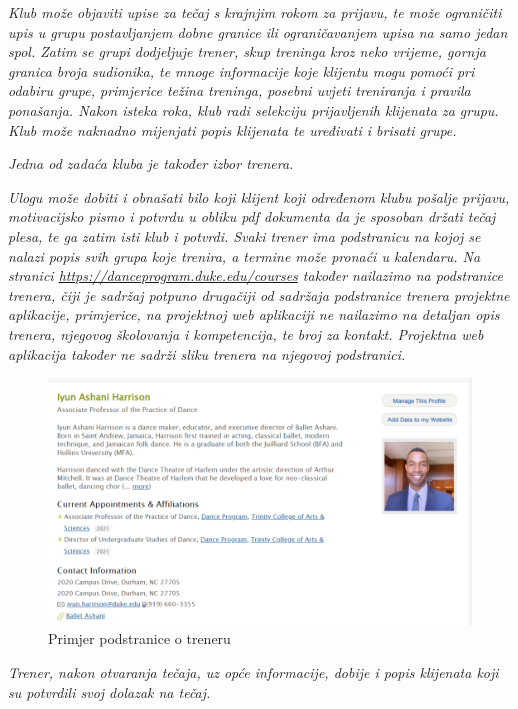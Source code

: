 \textit{Klub može objaviti upise za tečaj s krajnjim rokom za prijavu, te može ograničiti upis u grupu postavljanjem dobne granice ili ograničavanjem upisa na samo jedan spol. Zatim se grupi dodjeljuje trener, skup treninga kroz neko vrijeme, gornja granica broja sudionika, te mnoge informacije koje klijentu mogu pomoći pri odabiru grupe, primjerice težina treninga, posebni uvjeti treniranja i pravila ponašanja. Nakon isteka roka, klub radi selekciju prijavljenih klijenata za grupu. Klub može naknadno mijenjati popis klijenata te uređivati i brisati grupe.}

\textit{Jedna od zadaća kluba je također izbor trenera.}

\textit{Ulogu  može dobiti i obnašati bilo koji klijent koji određenom klubu pošalje prijavu, motivacijsko pismo i potvrdu u obliku pdf dokumenta da je sposoban držati tečaj plesa, te ga zatim isti klub i potvrdi. Svaki trener ima podstranicu na kojoj se nalazi popis svih grupa koje trenira, a termine može pronaći u kalendaru. Na stranici \url{https://danceprogram.duke.edu/courses} također nailazimo na podstranice trenera, čiji je sadržaj potpuno drugačiji od sadržaja podstranice trenera projektne aplikacije, primjerice, na projektnoj web aplikaciji ne nailazimo na detaljan opis trenera, njegovog školovanja i kompetencija, te broj za kontakt. Projektna web aplikacija također ne sadrži sliku trenera na njegovoj podstranici.}

\begin{figure}[H]
	\centering
	\includegraphics[scale=0.3]{slike/opis_4.png}
	\caption{Primjer podstranice o treneru}
	\label{fig:screenshot004}
\end{figure}

\textit{Trener, nakon otvaranja tečaja, uz opće informacije, dobije i popis klijenata koji su potvrdili svoj dolazak na tečaj.}

